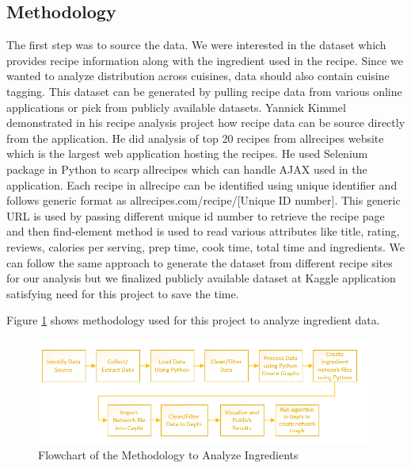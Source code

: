 \documentclass[sigconf]{acmart}
\begin{document}
\subsection{Methodology}
The first step was to source the data. We were interested in the dataset which provides recipe information along with the ingredient used in the recipe. Since we wanted to analyze distribution across cuisines, data should also contain cuisine tagging. This dataset can be generated by pulling recipe data from various online applications or pick from publicly available datasets. Yannick Kimmel \cite{www-nyc} demonstrated in his recipe analysis project how recipe data can be source directly from the application. He did analysis of top 20 recipes from allrecipes website which is the largest web application hosting the recipes. He used Selenium package in Python to scarp allrecipes which can handle AJAX used in the application. Each recipe in allrecipe can be identified using unique identifier and follows generic format as allrecipes.com/recipe/[Unique ID number]. This generic URL is used by passing different unique id number to retrieve the recipe page and then find-element method is used to read various attributes like title, rating, reviews, calories per serving, prep time, cook time, total time and ingredients. We can follow the same approach to generate the dataset from different recipe sites for our analysis but we finalized publicly available dataset at Kaggle application satisfying need for this project to save the time.

Figure \ref{f:methodology} shows methodology used for this project to analyze ingredient data.
\begin{figure}[!ht]
  \centering\includegraphics[width=\columnwidth]{images/methodology.PNG}
  \caption{Flowchart of the Methodology to Analyze Ingredients }\label{f:methodology}
\end{figure}
\end{document}
